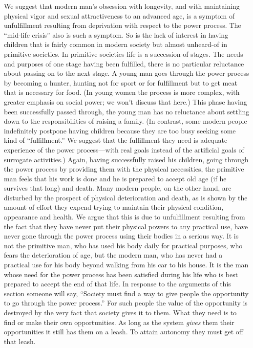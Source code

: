  We suggest that modern man’s obsession with longevity, and with maintaining physical vigor and sexual attractiveness to an advanced age, is a symptom of unfulfillment resulting from deprivation with respect to the power process. The “mid-life crisis” also is such a symptom. So is the lack of interest in having children that is fairly common in modern society but almost unheard-of in primitive societies.\break
{} In primitive societies life is a succession of stages. The needs and purposes of one stage having been fulfilled, there is no particular reluctance about passing on to the next stage. A young man goes through the power process by becoming a hunter, hunting not for sport or for fulfillment but to get meat that is necessary for food. (In young women the process is more complex, with greater emphasis on social power; we won’t discuss that here.) This phase having been successfully passed through, the young man has no reluctance about settling down to the responsibilities of raising a family. (In contrast, some modern people indefinitely postpone having children because they are too busy seeking some kind of “fulfillment.” We suggest that the fulfillment they need is adequate experience of the power process—with real goals instead of the artificial goals of surrogate activities.) Again, having successfully raised his children, going through the power process by providing them with the physical necessities, the primitive man feels that his work is done and he is prepared to accept old age (if he survives that long) and death. Many modern people, on the other hand, are disturbed by the prospect of physical deterioration and death, as is shown by the amount of effort they expend trying to maintain their physical condition, appearance and health. We argue that this is due to unfulfillment resulting from the fact that they have never put their physical powers to any practical use, have never gone through the power process using their bodies in a serious way. It is not the primitive man, who has used his body daily for practical purposes, who fears the deterioration of age, but the modern man, who has never had a practical use for his body beyond walking from his car to his house. It is the man whose need for the power process has been satisfied during his life who is best prepared to accept the end of that life.\break
{} In response to the arguments of this section someone will say, “Society must find a way to give people the opportunity to go through the power process.” For such people the value of the opportunity is destroyed by the very fact that society gives it to them. What they need is to find or make their own opportunities. As long as the system {\em gives} them their opportunities it still has them on a leash. To attain autonomy they must get off that leash.

